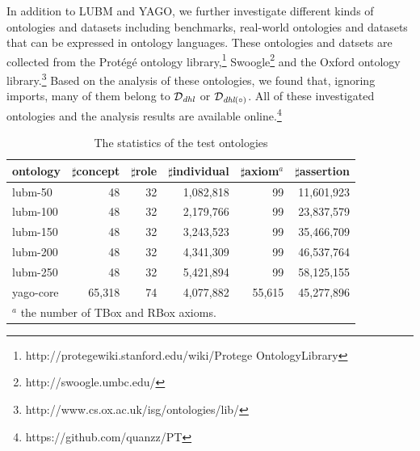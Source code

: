 In addition to LUBM and YAGO, we further investigate different kinds of ontologies and datasets
including benchmarks, real-world ontologies and datasets that can be
expressed in ontology languages.
These ontologies and datsets are collected from the Prot\'{e}g\'{e}
ontology
library,\footnote{http://protegewiki.stanford.edu/wiki/Protege\textunderscore
  Ontology\textunderscore Library}
Swoogle\footnote{http://swoogle.umbc.edu/} and the Oxford ontology library.\footnote{http://www.cs.ox.ac.uk/isg/ontologies/lib/}
Based on the analysis of these ontologies, we found that, ignoring imports, many of them
belong to $\mathcal{D}_{\textit{\text{dhl}}}$ or $\mathcal{D}_{\textit{\text{dhl}}(\circ)}$.
All of these investigated ontologies and the analysis results are available online.\footnote{https://github.com/quanzz/PT}

\begin{table}
\centering
\caption{The statistics of the test ontologies}
\begin{tabular}{|l|r|r|r|r|r|}
\hline
ontology&$\sharp$concept&$\sharp$role&$\sharp$individual&$\sharp$axiom$^{a}$&$\sharp$assertion\\
\hline
lubm-50&48&32&1,082,818&99&11,601,923\\
lubm-100&48&32&2,179,766&99&23,837,579\\
lubm-150&48&32&3,243,523&99&35,466,709\\
lubm-200&48&32&4,341,309&99&46,537,764\\
lubm-250&48&32&5,421,894&99&58,125,155\\
yago-core&65,318&74&4,077,882&55,615&45,277,896\\
\hline
\multicolumn{5}{l}{$^{a}$ \small the number of TBox and RBox axioms.}\\
\end{tabular}
\label{tab:onto}
\end{table}

